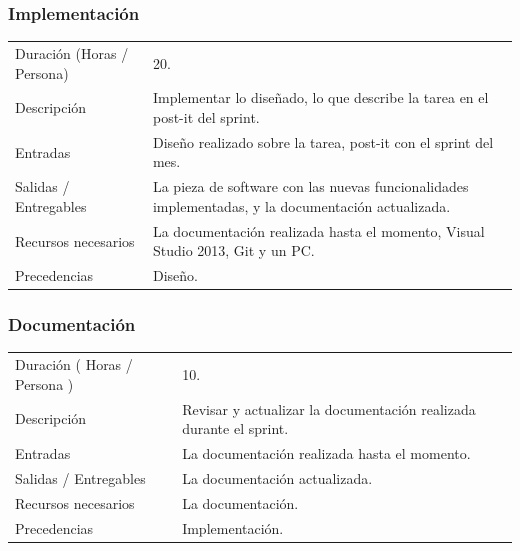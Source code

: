 \subsubsection{Implementaci\'{o}n}
\begin{table}[H]
    \begin{center}
        \begin{tabular}{l p{8cm}}
            Duraci\'{o}n (Horas / Persona)        & 20. \\ 
            Descripci\'{o}n                       & Implementar lo dise\~{n}ado, lo que describe la tarea en el post-it del sprint. \\
            Entradas                              & Dise\~{n}o realizado sobre la tarea, post-it con el sprint del mes.\\
            Salidas / Entregables                 & La pieza de software con las nuevas funcionalidades implementadas, y la documentaci\'{o}n
                                                    actualizada. \\
            Recursos necesarios                   & La documentaci\'{o}n realizada hasta el momento, Visual Studio 2013, Git y un 
            										PC. \\
            Precedencias                          & Dise\~{n}o. \\
        \end{tabular}
    \end{center}
    
\end{table}

\subsubsection{Documentaci\'{o}n}
\begin{table}[H]
    \begin{center}
        \begin{tabular}{l p{8cm}}
            Duraci\'{o}n ( Horas / Persona )      & 10. \\ 
            Descripci\'{o}n                       & Revisar y actualizar la documentaci\'{o}n realizada durante el sprint. \\
            Entradas                              & La documentaci\'{o}n realizada hasta el momento.\\
            Salidas / Entregables                 & La documentaci\'{o}n actualizada. \\
            Recursos necesarios                   & La documentaci\'{o}n. \\
            Precedencias                          & Implementaci\'{o}n. \\
        \end{tabular}
    \end{center}
    
\end{table}


